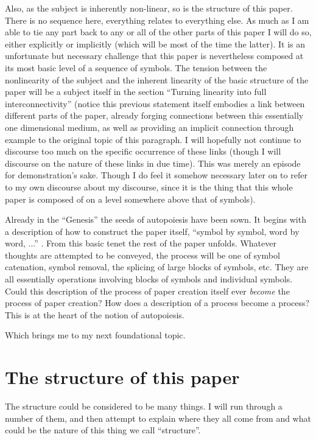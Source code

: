 \documentclass[12pt]{scrartcl}
\begin{document}
Also, as the subject is inherently non-linear, so is the structure of this paper.  There is no sequence here, everything relates to everything else.  As much as I am able to tie any part back to any or all of the other parts of this paper I will do so, either explicitly or implicitly (which will be most of the time the latter).  It is an unfortunate but necessary challenge that this paper is nevertheless composed at its most basic level of a sequence of symbols.  The tension between the nonlinearity of the subject and the inherent linearity of the basic structure of the paper will be a subject itself in the section ``Turning linearity into full interconnectivity'' (notice this previous statement itself embodies a link between different parts of the paper, already forging connections between this essentially one dimensional medium, as well as providing an implicit connection through example to the original topic of this paragraph.  I will hopefully not continue to discourse too much on the specific occurrence of these links (though I will discourse on the nature of these links in due time).  This was merely an episode for demonstration's sake.  Though I do feel it somehow necessary later on to refer to my own discourse about my discourse, since it is the thing that this whole paper is composed of on a level somewhere above that of symbols).  

Already in the ``Genesis'' the seeds of autopoiesis have been sown.  It begins with a description of how to construct the paper itself, ``symbol by symbol, word by word, ...'' \cite{Spangler}.  From this basic tenet the rest of the paper unfolds.  Whatever thoughts are attempted to be conveyed, the process will be one of symbol catenation, symbol removal, the splicing of large blocks of symbols, etc.  They are all essentially operations involving blocks of symbols and individual symbols.  Could this description of the process of paper creation itself ever \emph{become} the process of paper creation?  How does a description of a process become a process?  This is at the heart of the notion of autopoiesis.

Which brings me to my next foundational topic.

\section{The structure of this paper}

The structure could be considered to be many things.  I will run through a number of them, and then attempt to explain where they all come from and what could be the nature of this thing we call ``structure''.  
\end{document}
